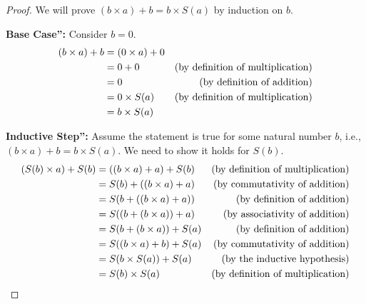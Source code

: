 \documentclass[10pt]{article}
\newenvironment{problem}[2][Problem]{\begin{trivlist}
\item[\hskip \labelsep {\bfseries #1}\hskip \labelsep {\bfseries #2.}]}{\end{trivlist}}
\begin{document}
\begin{problem}{1}
\begin{enumerate}
\begin{enumerate}
\begin{proof}
                        We will prove $(b \times a) + b = b \times S(a)$ by induction on $b$.

                        \textbf{Base Case'':} Consider \( b = 0 \).
                        \begin{align*}
                            (b \times a) + b &= (0 \times a) + 0 \\
                                             &= 0 + 0 & \text{(by definition of multiplication)} \hfill \\
                                             &= 0 & \text{(by definition of addition)} \hfill \\
                                             &= 0 \times S(a) & \text{(by definition of multiplication)} \hfill \\
                                             &= b \times S(a) 
                        \end{align*}

                        \textbf{Inductive Step'':} Assume the statement is true for some natural number \( b \), i.e., \( (b \times a) + b = b \times S(a) \). We need to show it holds for \( S(b) \).
                        \begin{align*}
                            (S(b) \times a) + S(b) &= ((b \times a) + a) + S(b) & \text{(by definition of multiplication)} \hfill \\
                                                   &= S(b) + ((b \times a) + a) & \text{(by commutativity of addition)} \hfill \\
                                                   &= S(b + ((b \times a) + a)) & \text{(by definition of addition)} \hfill \\
                                                   &= S((b + (b \times a)) + a) & \text{(by associativity of addition)} \hfill \\
                                                   &= S(b + (b \times a)) + S(a) & \text{(by definition of addition)} \hfill \\
                                                   &= S((b \times a) + b) + S(a) & \text{(by commutativity of addition)} \hfill \\
                                                   &= S(b \times S(a)) + S(a) & \text{(by the inductive hypothesis)} \hfill \\
                                                   &= S(b) \times S(a) & \text{(by definition of multiplication)} \hfill
                        \end{align*}


\end{proof}
\end{enumerate}
\end{enumerate}
\end{problem}
\end{document}
